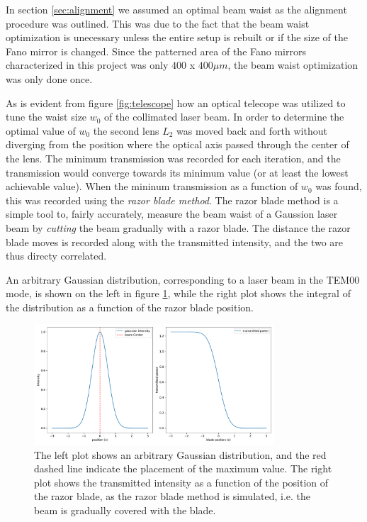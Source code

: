 In section \ref{sec:alignment} we assumed an optimal beam waist as the alignment procedure was outlined. This was due to the fact that the beam waist optimization is unecessary unless the entire setup is rebuilt or if the size of the Fano mirror is changed. Since the patterned area of the Fano mirrors characterized in this project was only $400$ x $400 \mu m$, the beam waist optimization was only done once.

As is evident from figure \ref{fig:telescope} how an optical telecope was utilized to tune the waist size $w_0$ of the collimated laser beam. In order to determine the optimal value of $w_0$ the second lens $L_2$ was moved back and forth without diverging from the position where the optical axis passed through the center of the lens. The minimum transmission was recorded for each iteration, and the transmission would converge towards its minimum value (or at least the lowest achievable value). When the mininum transmission as a function of $w_0$ was found, this was recorded using the \emph{razor blade method}. The razor blade method is a simple tool to, fairly accurately, measure the beam waist of a Gaussion laser beam by \emph{cutting} the beam gradually with a razor blade. The distance the razor blade moves is recorded along with the transmitted intensity, and the two are thus directy correlated\cite{Forster}.

An arbitrary Gaussian distribution, corresponding to a laser beam in the TEM00 mode, is shown on the left in figure \ref{fig:razor_blade_method}, while the right plot shows the integral of the distribution as a function of the razor blade position. 

\begin{figure}[h!]
    \centering
    \includegraphics[width=0.8\textwidth]{figures/razor_blade_method.pdf}
    \caption{The left plot shows an arbitrary Gaussian distribution, and the red dashed line indicate the placement of the maximum value. The right plot shows the transmitted intensity as a function of the position of the razor blade, as the razor blade method is simulated, i.e. the beam is gradually covered with the blade.}
    \label{fig:razor_blade_method}
\end{figure}

